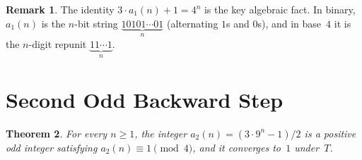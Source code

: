 \documentclass[12pt]{amsart}
\newtheorem{theorem}{Theorem}[section]
\theoremstyle{definition}
\newtheorem{remark}[theorem]{Remark}
\begin{document}
\begin{remark}
  The identity $3 \cdot a_1(n) + 1 = 4^n$ is the key algebraic fact.
  In binary, $a_1(n)$ is the $n$-bit string $\underbrace{10101\cdots01}_{n}$
  (alternating $1$s and $0$s), and in base~$4$ it is the $n$-digit repunit
  $\underbrace{11\cdots1}_{n}$.
\end{remark}

\section{Second Odd Backward Step}\label{sec:twoback}

\begin{theorem}\label{thm:a2}
  For every $n \geq 1$, the integer $a_2(n) = (3 \cdot 9^n - 1)/2$ is a
  positive odd integer satisfying $a_2(n) \equiv 1 \pmod{4}$, and it converges
  to~$1$ under~$T$.
\end{theorem}
\end{document}

